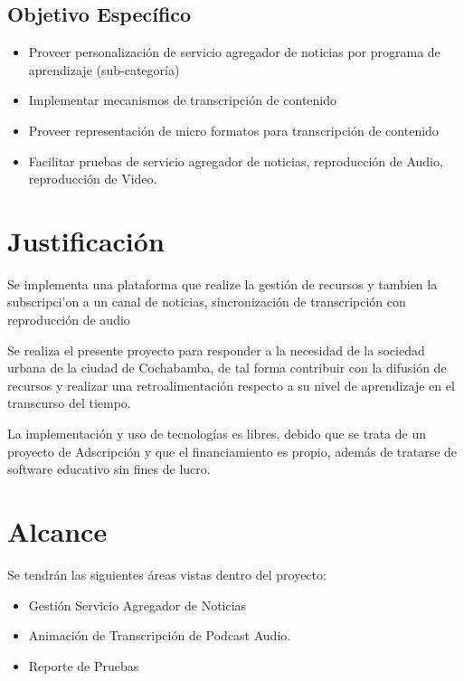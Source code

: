 \subsection{Objetivo Espec\'{i}fico}

\begin{itemize}

\item Proveer personalización de servicio agregador de noticias por programa de
aprendizaje (sub-categoría)

\item Implementar mecanismos de transcripción de contenido

\item Proveer representación de micro formatos para transcripción de contenido

\item Facilitar pruebas de servicio agregador de noticias, reproducción de Audio,
reproducción de Video.

\end{itemize}

\section{Justificaci\'{o}n}

Se implementa una plataforma que realize la gesti\'{o}n de recursos y tambien la subscripci'{o}n a un canal
de noticias, sincronizaci\'{o}n de transcripci\'{o}n con reproducci\'{o}n de audio

Se realiza el presente proyecto para responder a la necesidad de la sociedad urbana de la ciudad de Cochabamba,
de tal forma contribuir con la difusi\'{o}n de recursos y realizar una retroalimentaci\'{o}n respecto a su 
nivel de aprendizaje en el transcurso del tiempo.

La implementación y uso de tecnolog\'{i}as es libres, debido que se trata de un proyecto de Adscripci\'{o}n 
y que el financiamiento es propio, adem\'{a}s de tratarse de software educativo sin fines de lucro.

\section{Alcance}

Se tendrán las siguientes áreas vistas dentro del proyecto:

\begin{itemize}
\item Gestión Servicio Agregador de Noticias
\item Animación de Transcripción de Podcast Audio.
\item Reporte de Pruebas
\end{itemize}